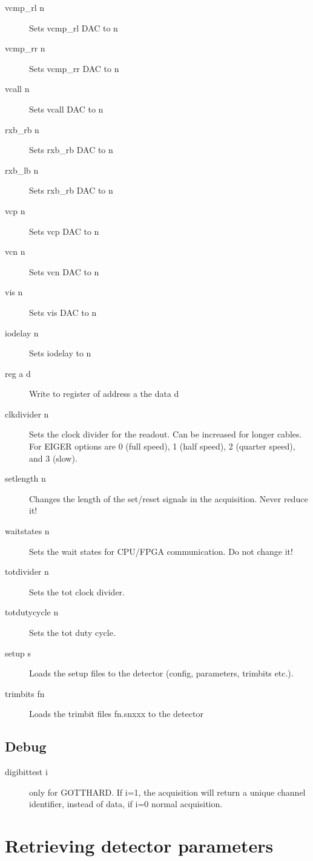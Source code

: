 \documentclass{article}
\begin{document}
\begin{description}
\item [vcmp\_rl n] Sets vcmp\_rl DAC to n 
\item [vcmp\_rr n] Sets vcmp\_rr DAC to n 
\item [vcall n] Sets vcall DAC to n 
\item [rxb\_rb n] Sets rxb\_rb DAC to n 
\item [rxb\_lb n] Sets rxb\_rb DAC to n 
\item [vcp n] Sets vcp DAC to n 
\item [vcn n] Sets vcn DAC to n 
\item [vis n] Sets vis DAC to n 
\item [iodelay n] Sets iodelay to n 
\item[reg a d]   Write to register of address a the data d  
\item[clkdivider n]  Sets the clock divider for the readout. Can be increased for longer cables. For EIGER options are 0 (full speed), 1 (half speed), 2 (quarter speed), and 3 (slow).
\item[setlength n]  Changes the length of the set/reset signals in the acquisition. Never reduce it!     
\item[waitstates n] Sets the wait states for CPU/FPGA communication. Do not change it!
\item[totdivider n]  Sets the tot clock divider.
\item[totdutycycle n] Sets the tot duty cycle.
\item[setup s] Loads the setup files to the detector (config, parameters, trimbits etc.).
\item[trimbits fn] Loads the trimbit files fn.snxxx to the detector
\end{description}
 
 
\subsection{Debug}
\begin{description}
\item[digibittest i] only for GOTTHARD. If i=1, the acquisition will return a unique channel identifier, instead of data, if i=0 normal acquisition.  
\end{description}


\section{Retrieving detector parameters}
\end{document}
